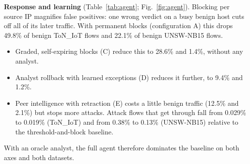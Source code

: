 \documentclass[conference]{IEEEtran}
\begin{document}
\textbf{Response and learning} (Table~\ref{tab:agent};
Fig.~\ref{fig:agent}). Blocking per source IP magnifies false positives: one
wrong verdict on a busy benign host cuts off all of its later traffic. With
permanent blocks (configuration A) this drops 49.8\% of benign ToN\_IoT flows
and 22.1\% of benign UNSW-NB15 flows.
\begin{itemize}
\item Graded, self-expiring blocks (C) reduce this to 28.6\% and 1.4\%,
without any analyst.
\item Analyst rollback with learned exceptions (D) reduces it further, to 9.4\% and 1.2\%.
\item Peer intelligence with retraction (E) costs a little benign traffic
(12.5\% and 2.1\%) but stops more attacks. Attack flows that get through fall
from 0.029\% to 0.019\% (ToN\_IoT) and from 0.38\% to 0.13\% (UNSW-NB15)
relative to the threshold-and-block baseline.
\end{itemize}
With an oracle analyst, the full agent therefore dominates the baseline on
both axes and both datasets.

\begin{table}[t]\centering
\caption{Four-agent stream simulation (3 seeds; EC2; oracle analyst). Dropped = benign flows refused by an active block; unblocked = attack flows not blocked or dropped. ToN\_IoT uses real source IPs; UNSW-NB15 uses synthetic sessions.}
\label{tab:agent}
\end{table}
\end{document}
